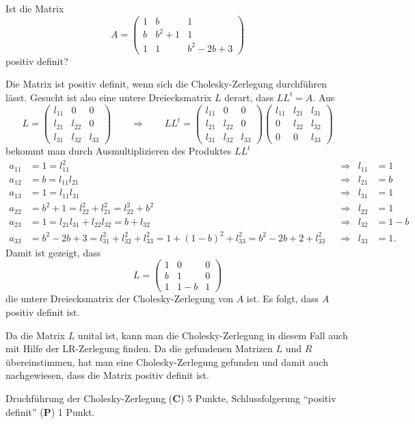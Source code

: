 Ist die Matrix
\[
A=\begin{pmatrix}
1&b&1\\
b&b^2+1&1 \\
1&1&b^2-2b+3
\end{pmatrix}
\]
positiv definit?

\begin{loesung}
Die Matrix ist positiv definit, wenn sich die Cholesky-Zerlegung 
durchführen lässt.
Gesucht ist also eine untere Dreiecksmatrix $L$ derart, dass $LL^t=A$.
Aus
\[
L
=
\begin{pmatrix}
l_{11}&0&0\\
l_{21}&l_{22}&0\\
l_{31}&l_{32}&l_{33}
\end{pmatrix}
\qquad\Rightarrow\qquad
LL^t
=
\begin{pmatrix}
l_{11}&0&0\\
l_{21}&l_{22}&0\\
l_{31}&l_{32}&l_{33}
\end{pmatrix}
\begin{pmatrix}
l_{11}&l_{21}&l_{31}\\
0&l_{22}&l_{32}\\
0&0&l_{33}
\end{pmatrix}
\]
bekommt man durch Ausmultiplizieren des Produktes $LL^t$
\begin{align*}
a_{11}&=1=l_{11}^2 &&\Rightarrow&l_{11}&=1
\\
a_{12}&=b=l_{11}l_{21}&&\Rightarrow&l_{21}&=b
\\
a_{13}&=1=l_{11}l_{31}&&\Rightarrow&l_{31}&=1
\\
a_{22}&=b^2+1=l_{22}^2+l_{21}^2=l_{22}^2+b^2&&\Rightarrow&l_{22}&=1
\\
a_{23}&=1=l_{21}l_{31}+l_{22}l_{32}=b+l_{32}&&\Rightarrow&l_{32}&=1-b
\\
a_{33}&=b^2-2b+3=l_{31}^2+l_{32}^2+l_{33}^2=1+(1-b)^2+l_{33}^2=b^2-2b+2+l_{33}^2
&&\Rightarrow&l_{33}&=1.
\end{align*}
Damit ist gezeigt, dass
\[
L=\begin{pmatrix}
1&0&0\\
b&1&0\\
1&1-b&1
\end{pmatrix}
\]
die untere Dreiecksmatrix der Cholesky-Zerlegung von $A$ ist.
Es folgt, dass $A$ positiv definit ist.
\end{loesung}

\begin{diskussion}
Da die Matrix $L$ unital ist, kann man die Cholesky-Zerlegung in diesem 
Fall auch mit Hilfe der LR-Zerlegung finden.
Da die gefundenen Matrizen $L$ und $R$ übereinstimmen, hat man eine
Cholesky-Zerlegung gefunden und damit auch nachgewiesen, dass die
Matrix positiv definit ist.
\end{diskussion}

\begin{bewertung}
Druchführung der Cholesky-Zerlegung ({\bf C}) 5 Punkte,
Schlussfolgerung ``positiv definit'' ({\bf P}) 1 Punkt.
\end{bewertung}

